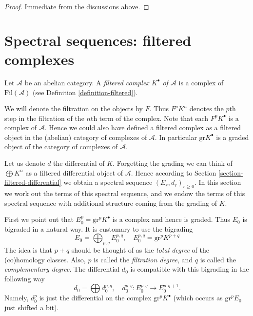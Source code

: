 \begin{proof}
Immediate from the discussions above.
\end{proof}














\section{Spectral sequences: filtered complexes}
\label{section-filtered-complex}

\begin{definition}
\label{definition-filtered-complex}
Let $\mathcal{A}$ be an abelian category.
A {\it filtered complex $K^\bullet$ of $\mathcal{A}$}
is a complex of $\text{Fil}(\mathcal{A})$ (see
Definition \ref{definition-filtered}).
\end{definition}

\noindent
We will denote the filtration on the objects by $F$. Thus
$F^pK^n$ denotes the $p$th step in the filtration of the $n$th term of the
complex. Note that each $F^pK^\bullet$ is a complex of $\mathcal{A}$.
Hence we could also have defined a filtered complex as a filtered object
in the (abelian) category of complexes of $\mathcal{A}$.
In particular $\text{gr} K^\bullet$ is a graded object of the
category of complexes of $\mathcal{A}$.

\medskip\noindent
Let us denote $d$ the differential of $K$. Forgetting the grading
we can think of $\bigoplus K^n$ as a filtered differential object of
$\mathcal{A}$. Hence according to Section \ref{section-filtered-differential}
we obtain a spectral sequence $(E_r, d_r)_{r \geq 0}$.
In this section we work out the terms
of this spectral sequence, and we endow the terms of this spectral sequence
with additional structure coming from the grading of $K$.

\medskip\noindent
First we point out that $E_0^p = \text{gr}^p K^\bullet$ is a
complex and hence is graded. Thus $E_0$ is bigraded in a natural
way. It is customary to use the bigrading
$$
E_0 = \bigoplus\nolimits_{p, q} E_0^{p, q},
\quad
E_0^{p, q} = \text{gr}^p K^{p + q}
$$
The idea is that $p + q$ should be thought of as the {\it total degree} of
the (co)homology classes. Also, $p$ is called the {\it filtration degree},
and $q$ is called the {\it complementary degree}.
The differential $d_0$ is compatible with this
bigrading in the following way
$$
d_0  = \bigoplus d_0^{p, q},
\quad
d_0^{p, q} : E_0^{p, q} \to E_0^{p, q + 1}.
$$
Namely, $d_0^p$ is just the differential on the complex
$\text{gr}^p K^\bullet$ (which occurs as $\text{gr}^pE_0$ just shifted
a bit).

